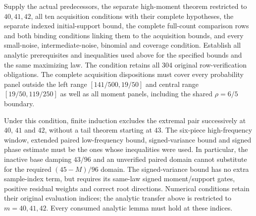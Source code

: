 \begin{condition}\label{ms:finite:floor40-condition}
Supply the actual predecessors, the separate high-moment theorem restricted
to $40,41,42$, all ten acquisition conditions with their
complete hypotheses, the separate indexed initial-support bound, the
complete full-count comparison rows and both binding conditions linking
them to the acquisition bounds, and every small-noise, intermediate-noise,
binomial and coverage condition. Establish all analytic prerequisites and
inequalities used above for the specified bounds and the same maximizing law.
The condition retains all 304 original row-verification obligations. The complete acquisition dispositions
must cover every probability panel outside the left range $[141/500,19/50]$ and
central range $[19/50,119/250]$ as well as all moment panels, including the
shared $\rho=6/5$ boundary.
\end{condition}
Under this condition, finite induction excludes the extremal pair successively at
$40$, $41$ and $42$, without a tail theorem starting at $43$. The six-piece high-frequency window, extended
paired low-frequency bound, signed-variance bound and signed phase estimate
must be the
ones whose inequalities were used. In particular, the inactive base damping
$43/96$ and an unverified paired domain cannot substitute for the required
$(45-M)/96$ domain. The signed-variance bound has no extra sample-index
term, but requires its same-law signed moment/support gates, positive residual
weights and correct root directions. Numerical conditions retain their
original evaluation indices; the analytic transfer above is restricted to
$m=40,41,42$. Every consumed analytic lemma must hold at these indices.
